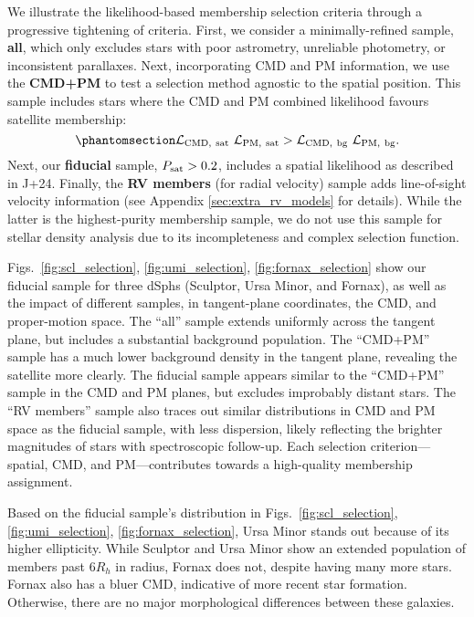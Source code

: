 We illustrate the likelihood-based membership selection criteria through
a progressive tightening of criteria. First, we consider a
minimally-refined sample, \textbf{all}, which only excludes stars with
poor astrometry, unreliable photometry, or inconsistent parallaxes.
Next, incorporating CMD and PM information, we use the \textbf{CMD+PM}
to test a selection method agnostic to the spatial position. This sample
includes stars where the CMD and PM combined likelihood favours
satellite membership:
\begin{equation}\protect\phantomsection\label{eq:sel_cmd_pm}{
{\cal L}_{\rm CMD,\ sat}\ {\cal L}_{\rm PM,\ sat} > {\cal L}_{\rm CMD,\ bg}\ {\cal L}_{\rm PM,\ bg}.
}\end{equation} Next, our \textbf{fiducial} sample,
\(P_{\rm sat} > 0.2\), includes a spatial likelihood as described in
J+24. Finally, the \textbf{RV members} (for radial velocity) sample adds
line-of-sight velocity information (see Appendix
\ref{sec:extra_rv_models} for details). While the latter is the
highest-purity membership sample, we do not use this sample for stellar
density analysis due to its incompleteness and complex selection
function.

Figs.~\ref{fig:scl_selection}, \ref{fig:umi_selection}, \ref{fig:fornax_selection}
show our fiducial sample for three dSphs (Sculptor, Ursa Minor, and
Fornax), as well as the impact of different samples, in tangent-plane
coordinates, the CMD, and proper-motion space. The ``all'' sample
extends uniformly across the tangent plane, but includes a substantial
background population. The ``CMD+PM'' sample has a much lower background
density in the tangent plane, revealing the satellite more clearly. The
fiducial sample appears similar to the ``CMD+PM'' sample in the CMD and
PM planes, but excludes improbably distant stars. The ``RV members''
sample also traces out similar distributions in CMD and PM space as the
fiducial sample, with less dispersion, likely reflecting the brighter
magnitudes of stars with spectroscopic follow-up. Each selection
criterion---spatial, CMD, and PM---contributes towards a high-quality
membership assignment.

Based on the fiducial sample's distribution in
Figs.~\ref{fig:scl_selection}, \ref{fig:umi_selection}, \ref{fig:fornax_selection},
Ursa Minor stands out because of its higher ellipticity. While Sculptor
and Ursa Minor show an extended population of members past \(6R_h\) in
radius, Fornax does not, despite having many more stars. Fornax also has
a bluer CMD, indicative of more recent star formation. Otherwise, there
are no major morphological differences between these galaxies.

